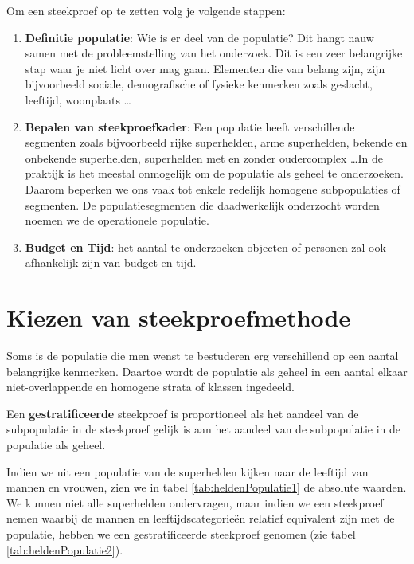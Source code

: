 Om een steekproef op te zetten volg je volgende stappen:
\begin{enumerate}
  \item \textbf{Definitie populatie}: Wie is er deel van de populatie? Dit hangt nauw samen met de probleemstelling van het onderzoek. Dit is een zeer belangrijke stap waar je niet licht over mag gaan. Elementen die van belang zijn, zijn bijvoorbeeld sociale, demografische of fysieke kenmerken zoals geslacht, leeftijd, woonplaats \dots
  \item \textbf{Bepalen van steekproefkader}: Een populatie heeft verschillende segmenten zoals bijvoorbeeld rijke superhelden, arme superhelden, bekende en onbekende superhelden, superhelden met en zonder oudercomplex \dots In de praktijk is het meestal onmogelijk om de populatie als geheel te onderzoeken. Daarom beperken we ons vaak tot enkele redelijk homogene subpopulaties of segmenten. De populatiesegmenten die daadwerkelijk onderzocht worden noemen we de operationele populatie.
  \item \textbf{Budget en Tijd}: het aantal te onderzoeken objecten of personen zal ook afhankelijk zijn van budget en tijd.
\end{enumerate}

\section{Kiezen van steekproefmethode}
  Soms is de populatie die men wenst te bestuderen erg verschillend op een aantal belangrijke kenmerken. Daartoe wordt de populatie als geheel in een aantal elkaar niet-overlappende en homogene strata of klassen ingedeeld.

\begin{definition}
Een \textbf{gestratificeerde}  steekproef is proportioneel als het aandeel van de subpopulatie in de steekproef gelijk is aan het aandeel van de subpopulatie in de populatie als geheel.
\end{definition}

\begin{example}
  Indien we uit een populatie van de superhelden kijken naar de leeftijd van  mannen en vrouwen, zien we in tabel \ref{tab:heldenPopulatie1} de absolute waarden. We kunnen niet alle superhelden ondervragen, maar indien we een steekproef nemen waarbij de mannen en leeftijdscategorie\"en relatief equivalent zijn met de populatie, hebben we een gestratificeerde steekproef genomen (zie tabel \ref{tab:heldenPopulatie2}).
\end{example}

